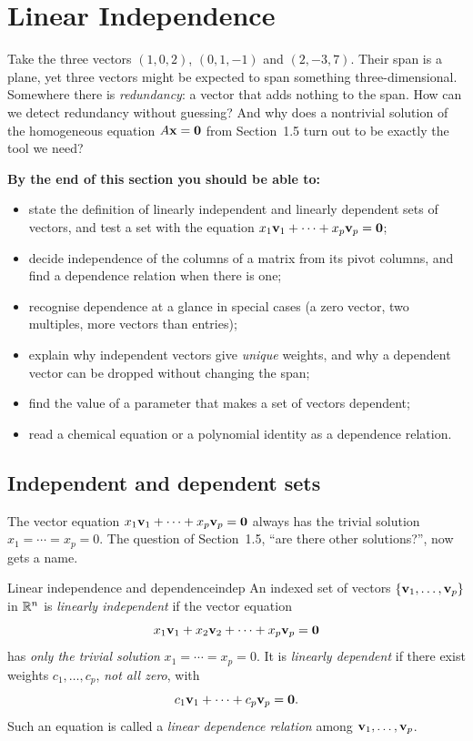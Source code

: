 \documentclass[11pt]{article}
\begin{document}
\section{Linear Independence}

\begin{guide}
Take the three vectors $(1,0,2)$, $(0,1,-1)$ and $(2,-3,7)$. Their span is a plane, yet three vectors might be expected to span something three-dimensional. Somewhere there is \emph{redundancy}: a vector that adds nothing to the span.
How can we detect redundancy without guessing? And why does a nontrivial solution of the homogeneous equation $A\mathbf{x}=\mathbf{0}$ from Section~1.5 turn out to be exactly the tool we need?
\end{guide}

\textbf{By the end of this section you should be able to:}
\begin{itemize}
  \item state the definition of linearly independent and linearly dependent sets of vectors, and test a set with the equation $x_1\mathbf{v}_1+\cdots+x_p\mathbf{v}_p=\mathbf{0}$;
  \item decide independence of the columns of a matrix from its pivot columns, and find a dependence relation when there is one;
  \item recognise dependence at a glance in special cases (a zero vector, two multiples, more vectors than entries);
  \item explain why independent vectors give \emph{unique} weights, and why a dependent vector can be dropped without changing the span;
  \item find the value of a parameter that makes a set of vectors dependent;
  \item read a chemical equation or a polynomial identity as a dependence relation.
\end{itemize}

\subsection*{Independent and dependent sets}

The vector equation $x_1\mathbf{v}_1+\cdots+x_p\mathbf{v}_p=\mathbf{0}$ always has the trivial solution $x_1=\cdots=x_p=0$. The question of Section~1.5, ``are there other solutions?'', now gets a name.

\begin{defn}{Linear independence and dependence}{indep}
An indexed set of vectors $\{\mathbf{v}_1,\dots,\mathbf{v}_p\}$ in $\mathbb{R}^n$ is \emph{linearly independent} if the vector equation
\[
x_1\mathbf{v}_1+x_2\mathbf{v}_2+\cdots+x_p\mathbf{v}_p=\mathbf{0}
\]
has \emph{only the trivial solution} $x_1=\cdots=x_p=0$. It is \emph{linearly dependent} if there exist weights $c_1,\dots,c_p$, \emph{not all zero}, with
\[
c_1\mathbf{v}_1+\cdots+c_p\mathbf{v}_p=\mathbf{0}.
\]
Such an equation is called a \emph{linear dependence relation} among $\mathbf{v}_1,\dots,\mathbf{v}_p$.
\end{defn}
\end{document}
